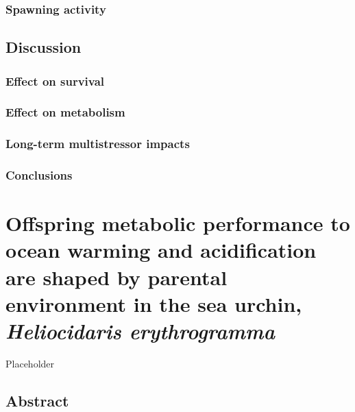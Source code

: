 \documentclass[
  oneside, 11pt, a4paper]{memoir}
\begin{document}
\hypertarget{spawning-activity}{%
\subsection{Spawning activity}\label{spawning-activity}}

\hypertarget{discussion-1}{%
\section{Discussion}\label{discussion-1}}

\hypertarget{effect-on-survival}{%
\subsection{Effect on survival}\label{effect-on-survival}}

\hypertarget{effect-on-metabolism}{%
\subsection{Effect on metabolism}\label{effect-on-metabolism}}

\hypertarget{long-term-multistressor-impacts}{%
\subsection{Long-term multistressor impacts}\label{long-term-multistressor-impacts}}

\hypertarget{conclusions}{%
\subsection{Conclusions}\label{conclusions}}

\hypertarget{chapter4}{%
\chapter{\texorpdfstring{Offspring metabolic performance to ocean warming and acidification are shaped by parental environment in the sea urchin, \emph{Heliocidaris erythrogramma}}{Offspring metabolic performance to ocean warming and acidification are shaped by parental environment in the sea urchin, Heliocidaris erythrogramma}}\label{chapter4}}

Placeholder

\hypertarget{abstract-2}{%
\section*{Abstract}\label{abstract-2}}
\end{document}
